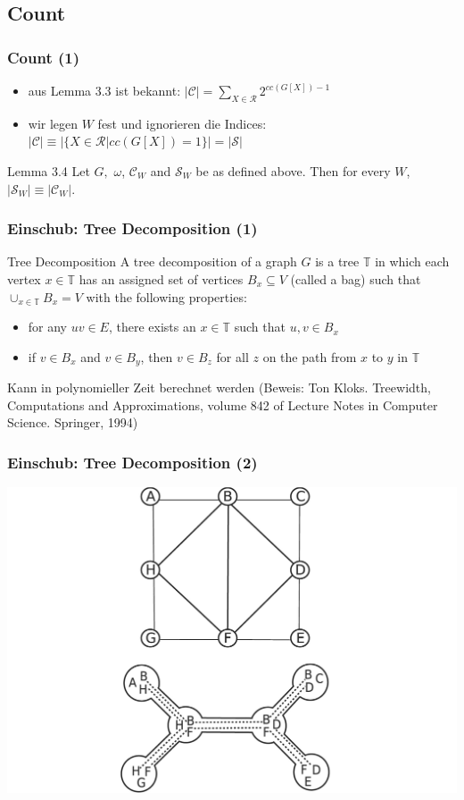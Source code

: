 \documentclass{beamer}
\begin{document}
\subsection{Count}
\begin{frame}
\frametitle{Count (1)}
\begin{itemize}
\item aus Lemma 3.3 ist bekannt: $|\mathcal{C}|=\sum_{X \in \mathcal{R}} 2^{cc(G[X])-1}$
\item wir legen $W$ fest und ignorieren die Indices: $|\mathcal{C}| \equiv |\{X \in \mathcal{R} |cc(G[X]) = 1\}| = |\mathcal{S}|$
\end{itemize}
\begin{block}{Lemma 3.4}
Let $G,$ $\omega$, $\mathcal{C}_W$ and $\mathcal{S}_W$ be as defined above. Then for every $W$, $|\mathcal{S}_W| \equiv |\mathcal{C}_W|$.
\end{block}
\end{frame}
\begin{frame}
\frametitle{Einschub: Tree Decomposition (1)}
\begin{block}{Tree Decomposition}
A tree decomposition of a graph $G$ is a tree $\mathbb{T}$ in which each vertex $x \in \mathbb{T}$ has an assigned set of vertices $B_x \subseteq V$ (called a bag) such that $\cup_{x \in \mathbb{T}} B_x = V$ with the following properties:
\begin{itemize}
\item for any $uv \in E$, there exists an $x \in \mathbb{T}$ such that $u,v \in B_x$
\item if $v \in B_x$ and $v \in B_y$, then $v \in B_z$ for all $z$ on the path from $x$ to $y$ in $\mathbb{T}$
\end{itemize}
\end{block}
Kann in polynomieller Zeit berechnet werden (Beweis: Ton Kloks. Treewidth, Computations and Approximations, volume 842 of Lecture Notes in Computer Science. Springer, 1994)
\end{frame}
\begin{frame}
\frametitle{Einschub: Tree Decomposition (2)}
\begin{center}
\includegraphics[scale=0.15]{./imgs/tree_decomposition1.png}
\end{center}
\end{frame}
\end{document}
